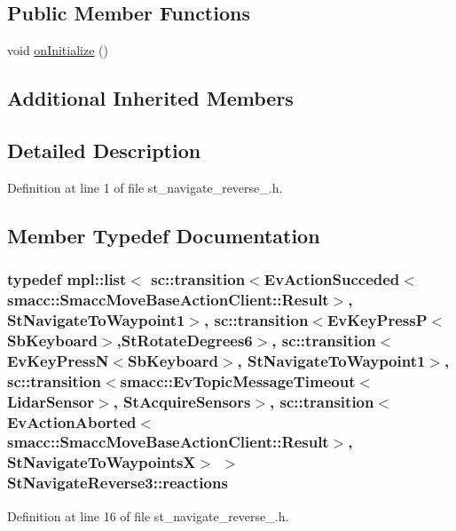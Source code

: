 \subsection*{Public Member Functions}
\begin{DoxyCompactItemize}
\item 
void \hyperlink{structStNavigateReverse3_a4cbaaac42b28f996e98d6b50a9527a89}{on\+Initialize} ()
\end{DoxyCompactItemize}
\subsection*{Additional Inherited Members}


\subsection{Detailed Description}


Definition at line 1 of file st\+\_\+navigate\+\_\+reverse\+\_.\+h.



\subsection{Member Typedef Documentation}
\subsubsection[{\texorpdfstring{reactions}{reactions}}]{\setlength{\rightskip}{0pt plus 5cm}typedef mpl\+::list$<$ sc\+::transition$<$Ev\+Action\+Succeded$<$smacc\+::\+Smacc\+Move\+Base\+Action\+Client\+::\+Result$>$, {\bf St\+Navigate\+To\+Waypoint1}$>$, sc\+::transition$<$Ev\+Key\+PressP$<$Sb\+Keyboard$>$,{\bf St\+Rotate\+Degrees6}$>$, sc\+::transition$<$Ev\+Key\+PressN$<$Sb\+Keyboard$>$, {\bf St\+Navigate\+To\+Waypoint1}$>$, sc\+::transition$<${\bf smacc\+::\+Ev\+Topic\+Message\+Timeout}$<${\bf Lidar\+Sensor}$>$, {\bf St\+Acquire\+Sensors}$>$, sc\+::transition$<$Ev\+Action\+Aborted$<$smacc\+::\+Smacc\+Move\+Base\+Action\+Client\+::\+Result$>$, {\bf St\+Navigate\+To\+WaypointsX}$>$ $>$ {\bf St\+Navigate\+Reverse3\+::reactions}}\hypertarget{structStNavigateReverse3_a8ad63828ba9ef72abfce33203118acfd}{}\label{structStNavigateReverse3_a8ad63828ba9ef72abfce33203118acfd}


Definition at line 16 of file st\+\_\+navigate\+\_\+reverse\+\_.\+h.



